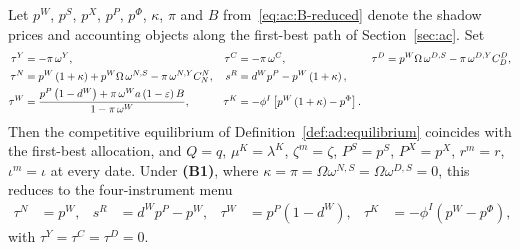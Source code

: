 \begin{proposition}\label{prop:ad:implementation}
Let $p^W$, $p^S$, $p^X$, $p^P$, $p^\Phi$, $\kappa$, $\pi$ and $B$ from~\eqref{eq:ac:B-reduced} denote the shadow prices and accounting objects along the first-best path of Section~\ref{sec:ac}. Set
\begin{align}
\tau^Y &= -\pi\,\omega^Y,
&
\tau^C &= -\pi\,\omega^C,
&
\tau^D &= p^W\Omega\,\omega^{D,S}-\pi\,\omega^{D,Y}C^D_D,
\label{eq:ad:implement-general}
\\
\tau^N &= p^W\left(1+\kappa\right)+p^W\Omega\,\omega^{N,S}-\pi\,\omega^{N,Y}C^N_N,
&
s^R &= d^Wp^P-p^W\left(1+\kappa\right),
\notag
\\
\tau^W &= \frac{p^P\left(1-d^W\right)+\pi\,\omega^Wa\left(1-\varepsilon\right)B}{1-\pi\,\omega^W},
&
\tau^K &= -\phi^I\left[p^W\left(1+\kappa\right)-p^\Phi\right].
\notag
\end{align}
Then the competitive equilibrium of Definition~\ref{def:ad:equilibrium} coincides with the first-best allocation, and $Q=q$, $\mu^K=\lambda^K$, $\zeta^m=\zeta$, $P^S=p^S$, $P^X=p^X$, $r^m=r$, $\iota^m=\iota$ at every date. Under \textbf{(B1)}, where $\kappa=\pi=\Omega\omega^{N,S}=\Omega\omega^{D,S}=0$, this reduces to the four-instrument menu
\begin{align}
\tau^N &= p^W,
&
s^R &= d^Wp^P-p^W,
&
\tau^W &= p^P\left(1-d^W\right),
&
\tau^K &= -\phi^I\left(p^W-p^\Phi\right),
\label{eq:ad:implement}
\end{align}
with $\tau^Y=\tau^C=\tau^D=0$.
\end{proposition}

